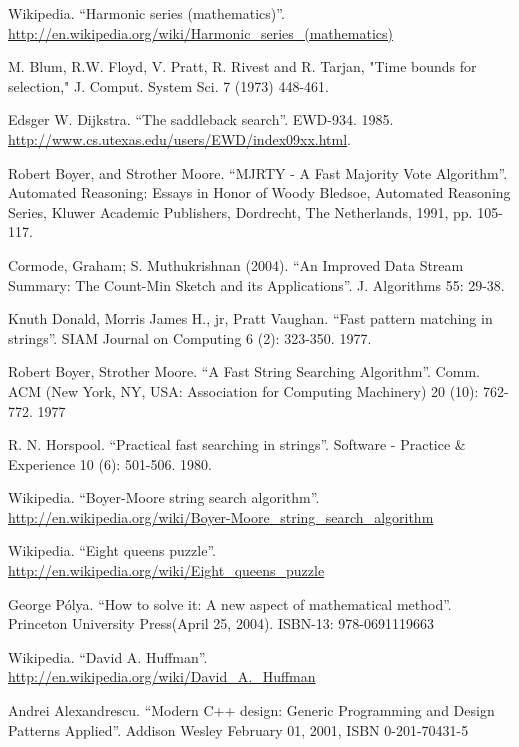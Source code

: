 \begin{thebibliography}{99}
Wikipedia. ``Harmonic series (mathematics)''. \url{http://en.wikipedia.org/wiki/Harmonic_series_(mathematics)}


M. Blum, R.W. Floyd, V. Pratt, R. Rivest and R. Tarjan, "Time bounds for selection," J. Comput. System Sci. 7 (1973) 448-461.

Edsger W. Dijkstra. ``The saddleback search''. EWD-934. 1985. \url{http://www.cs.utexas.edu/users/EWD/index09xx.html}.

Robert Boyer, and Strother Moore. ``MJRTY - A Fast Majority Vote Algorithm''. Automated Reasoning: Essays in Honor of Woody Bledsoe, Automated Reasoning Series, Kluwer Academic Publishers, Dordrecht, The Netherlands, 1991, pp. 105-117.

Cormode, Graham; S. Muthukrishnan (2004). ``An Improved Data Stream Summary: The Count-Min Sketch and its Applications''. J. Algorithms 55: 29-38.

Knuth Donald, Morris James H., jr, Pratt Vaughan. ``Fast pattern matching in strings''. SIAM Journal on Computing 6 (2): 323-350. 1977.

Robert Boyer, Strother Moore. ``A Fast String Searching Algorithm''. Comm. ACM (New York, NY, USA: Association for Computing Machinery) 20 (10): 762-772. 1977

R. N. Horspool. ``Practical fast searching in strings''. Software - Practice \& Experience 10 (6): 501-506. 1980.

Wikipedia. ``Boyer-Moore string search algorithm''. \url{http://en.wikipedia.org/wiki/Boyer-Moore_string_search_algorithm}

Wikipedia. ``Eight queens puzzle''. \url{http://en.wikipedia.org/wiki/Eight_queens_puzzle}

George P\'{o}lya. ``How to solve it: A new aspect of mathematical method''. Princeton University Press(April 25, 2004). ISBN-13: 978-0691119663

Wikipedia. ``David A. Huffman''. \url{http://en.wikipedia.org/wiki/David_A._Huffman}


Andrei Alexandrescu. ``Modern C++ design: Generic Programming and Design Patterns Applied''. Addison Wesley February 01, 2001, ISBN 0-201-70431-5


\end{thebibliography}
